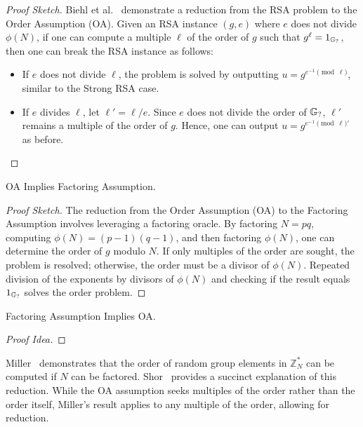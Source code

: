 \documentclass{iacrcc}
\begin{document}
\begin{proof}[Proof Sketch]
Biehl et al.~\cite{DCC:BBHM02} demonstrate a reduction from the RSA problem to the Order Assumption (OA). Given an RSA instance \((g, e)\) where \(e\) does not divide \(\phi(N)\), if one can compute a multiple \(\ell\) of the order of \(g\) such that \(g^\ell = 1_{\mathbb{G}_{?}}\), then one can break the RSA instance as follows:
\begin{itemize}
\item If \(e\) does not divide \(\ell\), the problem is solved by outputting \(u = g^{e^{-1} \pmod{\ell}}\), similar to the Strong RSA case.
\item If \(e\) divides \(\ell\), let \(\ell' = \ell / e\). Since \(e\) does not divide the order of \(\mathbb{G}_{?}\), \(\ell'\) remains a multiple of the order of \(g\). Hence, one can output \(u = g^{e^{-1} \pmod{\ell}'}\) as before.
\end{itemize}
\end{proof}

\begin{claim}
OA Implies Factoring Assumption.
\end{claim}

\begin{proof}[Proof Sketch]
The reduction from the Order Assumption (OA) to the Factoring Assumption involves leveraging a factoring oracle. By factoring \(N = pq\), computing \(\phi(N) = (p-1)(q-1)\), and then factoring \(\phi(N)\), one can determine the order of \(g\) modulo \(N\). If only multiples of the order are sought, the problem is resolved; otherwise, the order must be a divisor of \(\phi(N)\). Repeated division of the exponents by divisors of \(\phi(N)\) and checking if the result equals \(1_{\mathbb{G}_{?}}\) solves the order problem.
\end{proof}

\begin{claim}
Factoring Assumption Implies OA.
\end{claim}


\begin{proof}[Proof Idea]

\end{proof}

Miller~\cite{Miller1976} demonstrates that the order of random group elements in \(\mathbb{Z}_N^*\) can be computed if \(N\) can be factored. Shor~\cite{Shor1997} provides a succinct explanation of this reduction. While the OA assumption seeks multiples of the order rather than the order itself, Miller's result applies to any multiple of the order, allowing for reduction.
\end{document}
